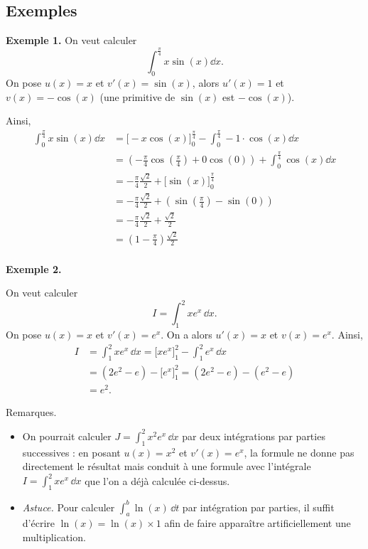 \documentclass[11pt,class=report,crop=false]{standalone}
\begin{document}
\subsection*{Exemples} 


\textbf{Exemple 1.}
On veut calculer \[\int_{0}^{\frac{\pi}{4}}x\sin(x)\dd x.\]
On pose $u(x)=x$ et $v'(x)=\sin(x)$, alors $u'(x)=1$ et $v(x)=-\cos(x)$ 
(une primitive de $\sin(x)$ est $-\cos(x)$).

Ainsi,
\begin{align*}
\int_{0}^{\frac{\pi}{4}}x\sin(x)\dd x
&=\big[-x\cos(x)\big]_{0}^{\frac{\pi}{4}}-\int_{0}^{\frac{\pi}{4}}-1 \cdot \cos(x)\dd  x\\
&=\left(-\tfrac{\pi}{4}\cos\left(\tfrac{\pi}{4}\right) + 0\cos(0)\right) + \int_{0}^{\frac{\pi}{4}}\cos(x)\dd x\\
&=-\frac{\pi}{4}\frac{\sqrt{2}}{2} + \big[\sin(x)\big]_{0}^{\frac{\pi}{4}}\\
&=-\frac{\pi}{4}\frac{\sqrt{2}}{2}  + \left( \sin\left(\tfrac{\pi}{4}\right)-\sin(0) \right) \\
&=-\frac{\pi}{4}\frac{\sqrt{2}}{2}  + \frac{\sqrt{2}}{2}  \\
&= (1-\frac\pi4)\frac{\sqrt2}{2} \\
\end{align*}

\bigskip

\textbf{Exemple 2.}

On veut calculer \[I = \int_{1}^{2} xe^x \, \dd x.\]
On pose $u(x)=x$ et $v'(x)=e^x$. On a alors $u'(x)=x$ et $v(x)=e^x$.
Ainsi,
\begin{align*}
I 
&= \int_{1}^{2}xe^x\,\dd x 
= \big[xe^x\big]_{1}^{2}-\int_{1}^{2}e^x\,\dd x \\
&= (2e^2-e) -\big[e^x\big]_{1}^{2} 
= (2e^2-e) - (e^2-e) \\
&= e^2.
\end{align*}


\bigskip

Remarques.
\begin{itemize}
   \item On pourrait calculer $J =  \int_{1}^{2}x^2e^x\,\dd x$ par deux intégrations par parties successives : en posant $u(x)=x^2$ et $v'(x)=e^x$, la formule ne donne pas directement le résultat mais conduit à une
formule avec l'intégrale $I = \int_{1}^{2}xe^x\,\dd x$ que l'on a déjà calculée ci-dessus.

	\item \emph{Astuce.}  Pour calculer $\int_a^b \ln(x)\,\dd t$ par intégration par parties, il suffit d'écrire $\ln(x) = \ln(x) \times 1$ afin de faire apparaître artificiellement une multiplication.

\end{itemize}
\end{document}
